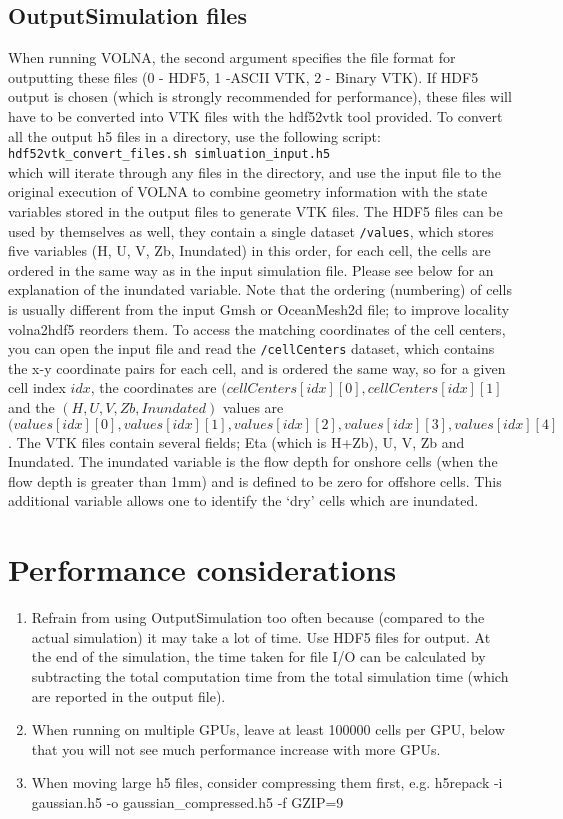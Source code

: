 \documentclass[11pt]{article}
\begin{document}
\subsection{OutputSimulation files}
When running VOLNA, the second argument specifies the file format for outputting these files (0 - HDF5, 1 -ASCII VTK, 2 - Binary VTK). If HDF5 output is chosen (which is strongly recommended for performance), these files will have to be converted into VTK files with the hdf52vtk tool provided. To convert all the output h5 files in a directory, use the following script:\\
{\tt hdf52vtk\_convert\_files.sh simluation\_input.h5}\\
which will iterate through any files in the directory, and use the input file to the original execution of VOLNA to combine geometry information with the state variables stored in the output files to generate VTK files.
The HDF5 files can be used by themselves as well, they contain a single dataset \texttt{/values}, which stores five variables (H, U, V, Zb, Inundated) in this order, for each cell, the cells are ordered in the same way as in the input simulation file. Please see below for an explanation of the inundated variable. Note that the ordering (numbering) of cells is usually different from the input Gmsh or OceanMesh2d file; to improve locality volna2hdf5 reorders them. To access the matching coordinates of the cell centers, you can open the input file and read the \texttt{/cellCenters} dataset, which contains the x-y coordinate pairs for each cell, and is ordered the same way, so for a given cell index $idx$, the coordinates are $(cellCenters[idx][0], cellCenters[idx][1]$ and the $(H,U,V,Zb,Inundated)$ values are $(values[idx][0],values[idx][1],values[idx][2],values[idx][3],values[idx][4]$.
The VTK files contain several fields; Eta (which is H+Zb), U, V, Zb and Inundated. 
The inundated variable is the flow depth for onshore cells (when the flow depth is greater than 1mm) and is defined to be zero for offshore cells. This additional variable allows one to identify the `dry' cells which are inundated.

\section{Performance considerations}
\begin{enumerate}
\item Refrain from using OutputSimulation too often because (compared to the actual simulation) it may take a lot of time. Use HDF5 files for output. At the end of the simulation, the time taken for file I/O can be calculated by subtracting the total computation time from the total simulation time (which are reported in the output file).
\item When running on multiple GPUs, leave at least 100000 cells per GPU, below that you will not see much performance increase with more GPUs. 
\item When moving large h5 files, consider compressing them first, e.g. h5repack -i gaussian.h5 -o gaussian\_compressed.h5 -f GZIP=9
\end{enumerate}
\end{document}
